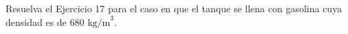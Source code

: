 \item Resuelva el Ejercicio 17 para el caso en que el tanque se llena con gasolina cuya densidad es de $680 \text{ kg/m}^3$.
